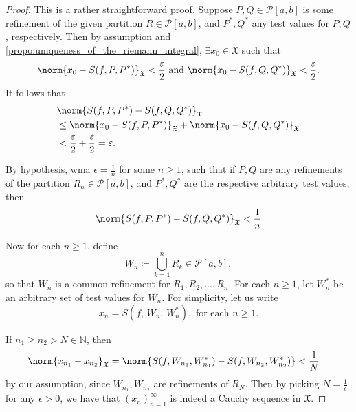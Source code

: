 \documentclass[notoc,notitlepage]{tufte-book}
\begin{document}
\begin{proof}
  \hlbnoted{$\implies$} This is a rather straightforward proof. Suppose $P, Q
  \in \mathcal{P}[a, b]$ is some refinement of the given partition $R \in
  \mathcal{P}[a, b]$, and $P^*, Q^*$ any test values for $P, Q$, respectively.
  Then by assumption and \cref{propo:uniqueness_of_the_riemann_integral},
  $\exists x_0 \in \mathfrak{X}$ such that
  \begin{equation*}
    \norm{x_0 - S(f, P, P^*)}_{\mathfrak{X}} < \frac{\epsilon}{2} \text{ and }
    \norm{x_0 - S(f, Q, Q^*)}_{\mathfrak{X}} < \frac{\epsilon}{2}.
  \end{equation*}
  It follows that
  \begin{align*}
    &\norm{S(f,P,P^*) - S(f,Q,Q^*)}_{\mathfrak{X}} \\
    &\leq \norm{x_0 - S(f,P,P^*)}_{\mathfrak{X}} + \norm{x_0 -
      S(f,Q,Q^*)}_{\mathfrak{X} } \\
    &< \frac{\epsilon}{2} + \frac{\epsilon}{2} = \epsilon.
  \end{align*}

  \noindent
  \hlbnoted{$\impliedby$} By hypothesis, wma $\epsilon = \frac{1}{n}$ for some
  $n \geq 1$, such that if $P, Q$ are any refinements of the partition $R_n \in
  \mathcal{P}[a, b]$, and $P^*, Q^*$ are the respective arbitrary test values,
  then
  \begin{equation*}
    \norm{S(f,P,P^*) - S(f,Q,Q^*)}_{\mathfrak{X}} < \frac{1}{n}
  \end{equation*}
  
  Now for each $n \geq 1$, define
  \begin{equation*}
    W_n \coloneqq \bigcup_{k=1}^{n} R_k \in \mathcal{P}[a, b],
  \end{equation*}
  so that $W_n$ is a common refinement for $R_1, R_2, \ldots, R_n$. For each $n
  \geq 1$, let $W_n^*$ be an arbitrary set of test values for $W_n$. For
  simplicity, let us write
  \begin{equation*}
    x_n = S(f, \, W_n, \, W_n^*), \text{ for each } n \geq 1.
  \end{equation*}

  \noindent
  If $n_1 \geq n_2 > N \in \mathbb{N}$, then
  \begin{align*}
    \norm{x_{n_1} - x_{n_2}}_{\mathfrak{X}} &= \norm{S(f,W_{n_1},W_{n_1}^*) -
    S(f,W_{n_2},W_{n_2}^*)} < \frac{1}{N}
  \end{align*}
  by our assumption, since $W_{n_1}, W_{n_2}$ are refinements of $R_N$. Then by
  picking $N = \frac{1}{\epsilon}$ for any $\epsilon > 0$, we have that
  $(x_n)_{n=1}^{\infty}$ is indeed a Cauchy sequence in $\mathfrak{X}$.


\end{proof}
\end{document}
